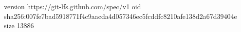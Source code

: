 version https://git-lfs.github.com/spec/v1
oid sha256:007fe7bad5918771f4c9aacda4d057346ec5fcddfc8210afe138d2a67d39404e
size 13886

